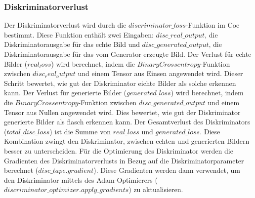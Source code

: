 \subsubsection{Diskriminatorverlust}
Der Diskriminatorverlust wird durch die $discriminator\_loss$-Funktion im Coe bestimmt. Diese Funktion enthält zwei Eingaben: $disc\_real\_output$, die Diskriminatorausgabe für das echte Bild und $disc\_generated\_output$, die Diskriminatorausgabe für das vom Generator erzeugte Bild. Der Verlust für echte Bilder ($real_loss$) wird berechnet, indem die $BinaryCrossentropy$-Funktion zwischen $disc_real_output$ und einem Tensor aus Einsen angewendet wird. Dieser Schritt bewertet, wie gut der Diskriminator eichte Bilder als solche erkennen kann.
Der Verlust für generierte Bilder ($generated\_loss$) wird berechnet, indem die $BinaryCrossentropy$-Funktion zwischen $disc\_generated\_output$ und einem Tensor aus Nullen angewendet wird. Dies bewertet, wie gut der Diskriminator generierte Bilder als flasch erkennen kann.
\newline
Der Gesamtverlust des Diskriminators ($total\_disc\_loss$) ist die Summe von $real\_loss$ und $generated\_loss$. Diese Kombination zwingt den Diskriminator, zwischen echten und generierten Bildern besser zu unterscheiden.
\newline
Für die Optimierung des Diskriminator werden die Gradienten des Diskriminatorverlusts in Bezug auf die Diskriminatorparameter berechnet ($disc\_tape.gradient$). Diese Gradienten werden dann verwendet, um den Diskriminator mittels des Adam-Optimierers ($discriminator\_optimizer.apply\_gradients$) zu aktualisieren.



